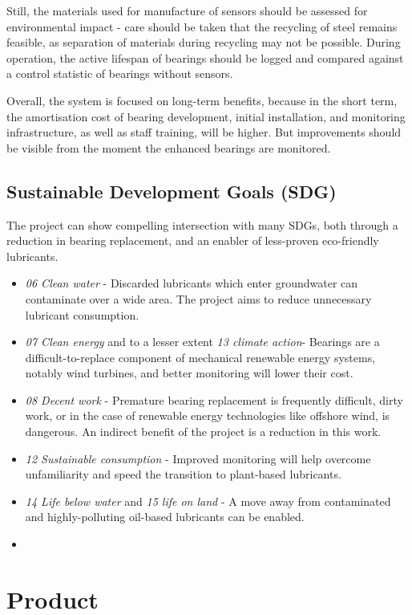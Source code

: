 \documentclass[runningheads]{llncs}
\begin{document}
    Still, the materials used for manufacture of sensors should be assessed for environmental impact - care should be taken that the recycling of steel remains feasible, as separation of materials during recycling may not be possible. During operation, the active lifespan of bearings should be logged and compared against a control statistic of bearings without sensors.
     
    Overall, the system is focused on long-term benefits, because in the short term, the amortisation cost of bearing development, initial installation, and monitoring infrastructure, as well as staff training, will be higher. But improvements should be visible from the moment the enhanced bearings are monitored.
\subsection{Sustainable Development Goals (SDG)}
    The project can show compelling intersection with many SDGs, both through a reduction in bearing replacement, and an enabler of less-proven eco-friendly lubricants.
    \begin{itemize}
        \item \emph{06 Clean water} - Discarded lubricants which enter groundwater can contaminate over a wide area. The project aims to reduce unnecessary lubricant consumption.
        \item \emph{07 Clean energy} and to a lesser extent \emph{13 climate action}- Bearings are a difficult-to-replace component of mechanical renewable energy systems, notably wind turbines, and better monitoring will lower their cost.
        \item \emph{08 Decent work} - Premature bearing replacement is frequently difficult, dirty work, or in the case of renewable energy technologies like offshore wind, is dangerous. An indirect benefit of the project is a reduction in this work.
        \item \emph{12 Sustainable consumption} - Improved monitoring will help overcome unfamiliarity and speed the transition to plant-based lubricants.
        \item \emph{14 Life below water} and \emph{15 life on land} - A move away from contaminated and highly-polluting oil-based lubricants can be enabled.
        \item \
    \end{itemize}
\section{Product}
\end{document}
